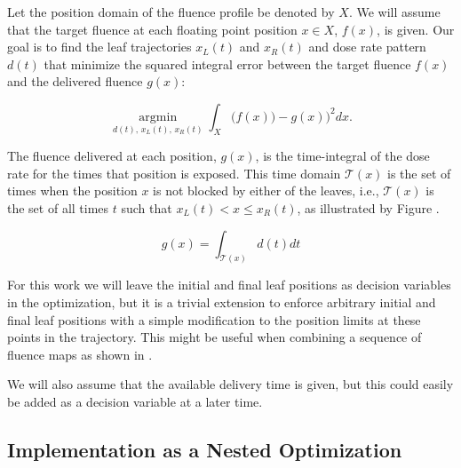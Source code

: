 Let the position domain of the fluence profile be denoted by $X$.
We will assume that the target fluence at each floating point position $x\in X$, $f(x)$, is given.
Our goal is to find the leaf trajectories $x_L(t)$ and $x_R(t)$ and dose rate pattern $d(t)$
that minimize the squared integral error between the target fluence $f(x)$ and the delivered fluence $g(x)$:

\begin{equation}
\underset{d(t), \, x_L(t), \, x_R(t)}{\operatorname{argmin}}
\int_X \bigg(f(x)) - g(x)\bigg)^2 dx .
\label{eqn:fluenceMapOptimization}
\end{equation}

\vspace{6pt}


The fluence delivered at each position, $g(x)$, is the time-integral of the dose rate for the times that position is exposed.
This time domain $\mathcal{T}(x)$ is the set of times when the position $x$ is not blocked by either of the leaves, i.e.,
$\mathcal{T}(x)$ is the set of all times $t$ such that $x_L(t) < x \leq x_R(t)$,
as illustrated by Figure  .

\begin{equation}
g(x) = \int_{\mathcal{T}(x)} d(t) dt
\label{eqn:deliveredFluenceDose}
\end{equation}

For this work we will leave the initial and final leaf positions as decision variables in the optimization, 
but it is a trivial extension to enforce arbitrary initial and final leaf positions 
with a simple modification to the position limits at these points in the trajectory. 
This might be useful when combining a sequence of fluence maps as shown in \cite{balvertcraft}.

We will also assume that the available delivery time is given,
but this could easily be added as a decision variable at a later time.



\subsection{Implementation as a Nested Optimization}

